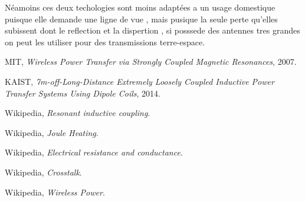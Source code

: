 \documentclass[12pt]{report}
\begin{document}
  Néamoins ces deux techologies sont moins adaptées a un usage domestique puisque elle demande une ligne de vue , mais pusique la seule perte qu'elles subissent dont le reflection et la dispertion , si posssede des antennes tres grandes on peut les utiliser pour des transmissions terre-espace.
\begin{thebibliography}{9}
    
  MIT,
  \emph{Wireless Power Transfer via Strongly Coupled Magnetic Resonances},
  2007.

  KAIST,
  \emph{7m-off-Long-Distance Extremely Loosely Coupled Inductive Power Transfer Systems Using Dipole Coils},
  2014.
  
  Wikipedia,
  \emph{Resonant inductive coupling}.
  
  Wikipedia,
  \emph{Joule Heating}.
  
  Wikipedia,
  \emph{Electrical resistance and conductance}.
  
  Wikipedia,
  \emph{Crosstalk}.
  
  Wikipedia,
  \emph{Wireless Power}.
  
\end{thebibliography}
\end{document}
